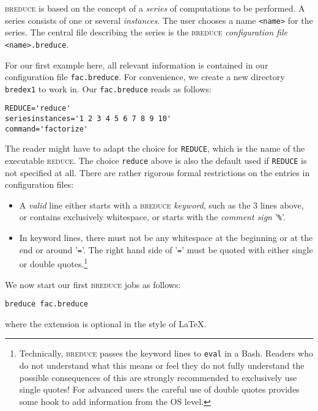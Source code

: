 \documentclass[a4paper]{article}
\begin{document}
\textsc{breduce} is based on the concept of a \emph{series} of computations to
be performed. A series consists of one or several \emph{instances}.
The user chooses a name \texttt{<name>} for the series. The central
file describing the series is the \textsc{breduce} \emph{configuration file}
\texttt{<name>.breduce}.

For our first example here, all relevant information is contained in
our configuration file \texttt{fac.breduce}. For convenience, we
create a new directory \texttt{bredex1} to work in. Our
\texttt{fac.breduce} reads as follows:
\begin{verbatim}
REDUCE='reduce'
seriesinstances='1 2 3 4 5 6 7 8 9 10'
command='factorize'
\end{verbatim}
The reader might have to adapt the choice for \texttt{REDUCE}, which
is the name of the executable \textsc{reduce}. The choice
\texttt{reduce} above is also the default used if \texttt{REDUCE} is
not specified at all. There are rather rigorous formal restrictions on
the entries in configuration files:
\begin{itemize}
\item A \emph{valid} line either starts with a \textsc{breduce}
  \emph{keyword}, such as the 3 lines above, or contains exclusively
  whitespace, or starts with the \emph{comment sign} '\texttt{\%}'.
\item In keyword lines, there must not be any whitespace at the
  beginning or at the end or around '\texttt{=}'. The right hand side
  of '\texttt{=}' must be quoted with either single or double
  quotes.\footnote{Technically, \textsc{breduce} passes the keyword
    lines to \texttt{eval} in a Bash. Readers who do not understand
    what this means or feel they do not fully understand the possible
    consequences of this are strongly recommended to exclusively use
    single quotes! For advanced users the careful use of double quotes
    provides some hook to add information from the OS level.}
\end{itemize}
We now start our first \textsc{breduce} jobs as follows:
\begin{verbatim}
breduce fac.breduce
\end{verbatim}
where the extension is optional in the style of \LaTeX.
\end{document}
